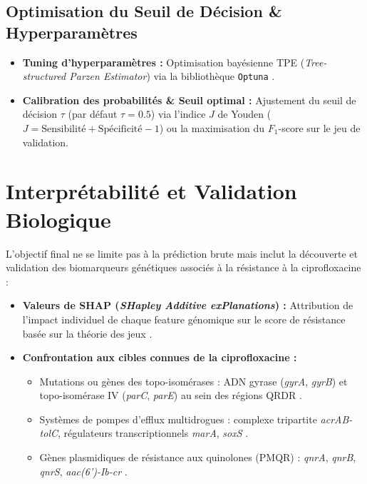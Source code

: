 \documentclass[11pt,a4paper]{article}
\begin{document}
\subsection{Optimisation du Seuil de Décision \& Hyperparamètres}

\begin{itemize}[leftmargin=*, label=$\bullet$]
    \item \textbf{Tuning d'hyperparamètres :} Optimisation bayésienne TPE (\textit{Tree-structured Parzen Estimator}) via la bibliothèque \texttt{Optuna} \citep{bergstra2011algorithms,akiba2019optuna}.
    \item \textbf{Calibration des probabilités \& Seuil optimal :} Ajustement du seuil de décision $\tau$ (par défaut $\tau = 0.5$) via l'indice $J$ de Youden ($J = \text{Sensibilité} + \text{Spécificité} - 1$) \citep{youden1950index} ou la maximisation du $F_1$-score sur le jeu de validation.
\end{itemize}

\section{Interprétabilité et Validation Biologique}

L'objectif final ne se limite pas à la prédiction brute mais inclut la découverte et validation des biomarqueurs génétiques associés à la résistance à la ciprofloxacine :
\begin{itemize}[leftmargin=*, label=$\bullet$]
    \item \textbf{Valeurs de SHAP (\textit{SHapley Additive exPlanations}) :} Attribution de l'impact individuel de chaque feature génomique sur le score de résistance basée sur la théorie des jeux \citep{lundberg2017unified,lundberg2020local}.
    \item \textbf{Confrontation aux cibles connues de la ciprofloxacine :}
    \begin{itemize}
        \item Mutations ou gènes des topo-isomérases : ADN gyrase (\textit{gyrA}, \textit{gyrB}) et topo-isomérase IV (\textit{parC}, \textit{parE}) au sein des régions QRDR \citep{hopkins2005mechanisms,aldred2014mechanism}.
        \item Systèmes de pompes d'efflux multidrogues : complexe tripartite \textit{acrAB-tolC}, régulateurs transcriptionnels \textit{marA}, \textit{soxS} \citep{nikaido2012efflux,du2018multidrug}.
        \item Gènes plasmidiques de résistance aux quinolones (PMQR) : \textit{qnrA}, \textit{qnrB}, \textit{qnrS}, \textit{aac(6')-Ib-cr} \citep{jacoby2005mechanisms,rodriguezmartinez2016mechanisms}.
    \end{itemize}
\end{itemize}
\end{document}
